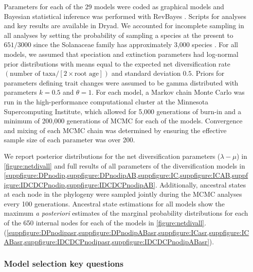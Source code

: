 Parameters for each of the 29 models were coded as graphical models and Bayesian statistical inference was performed with RevBayes \citep{hoehna_2016}.
Scripts for analyses and key results are available in Dryad. %
We accounted for incomplete sampling in all analyses by setting the probability of sampling a species at the present to $651/3000$ \citep[using the method of][]{fitzjohn_2009} since the Solanaceae family has approximately 3,000 species \citep{solsource}.
For all models, we assumed that speciation and extinction parameters had log-normal prior distributions with means equal to the expected net diversification rate $(\text{number of taxa} / [2 \times \text{root age}])$ and standard deviation $0.5$.
Priors for parameters defining trait changes were assumed to be gamma distributed with parameters $k=0.5$ and $\theta=1$. 
For each model, a Markov chain Monte Carlo \citep[MCMC;][]{metropolis1953equation,Hastings1970} was run in the high-performance computational cluster at the Minnesota Supercomputing Institute, which allowed for 5,000 generations of burn-in and a minimum of 200,000 generations of MCMC for each of the models.
Convergence and mixing of each MCMC chain was determined by ensuring the effective sample size of each parameter was over 200.

We report posterior distributions for the net diversification parameters ($\lambda - \mu$)  in \cref{figure:netdivall} and full results of all parameters of the diversification models in \cref{suppfigure:DPnodip,suppfigure:DPnodipAB,suppfigure:IC,suppfigure:ICAB,suppfigure:IDCDCPnodip,suppfigure:IDCDCPnodipAB}.
Additionally, ancestral states at each node in the phylogeny were sampled jointly during the MCMC analyses every 100 generations. 
Ancestral state estimations for all models show the maximum \emph{a posteriori} estimates of the marginal probability distributions for each of the 650 internal nodes for each of the models in \cref{figure:netdivall}. (\cref{suppfigure:DPnodipasr,suppfigure:DPnodipABasr,suppfigure:ICasr,suppfigure:ICABasr,suppfigure:IDCDCPnodipasr,suppfigure:IDCDCPnodipABasr}).

\subsubsection{Model selection key questions}

